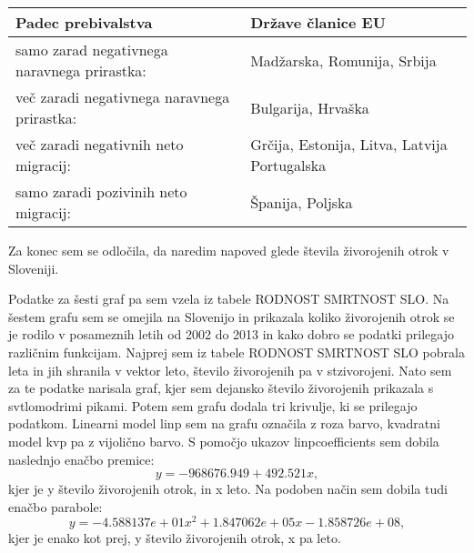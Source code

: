 \documentclass[11pt,a4paper]{article}
\begin{document}
\newpage
\begin{table} [h]

\begin{tabular}{|l| l| }

\hline

\textbf{Padec prebivalstva}&\textbf{Države članice EU} \\


\hline


\multicolumn{1}{|l|}{samo zarad negativnega naravnega prirastka:}&\multicolumn{1}{|p{8cm}|}{ Madžarska, Romunija, Srbija} \\


\hline


\multicolumn{1}{|l|}{več zaradi negativnega naravnega prirastka:}&\multicolumn{1}{|p{8cm}|}{Bulgarija, Hrvaška}\\


\hline


\multicolumn{1}{|l|}{več zaradi negativnih neto migracij:}&\multicolumn{1}{|p{8cm}|}{Grčija, Estonija, Litva, Latvija Portugalska}\\


\hline


\multicolumn{1}{|l|}{samo zaradi pozivinih neto migracij:}&\multicolumn{1}{|l|}{Španija, Poljska}\\


\hline



\end{tabular}


\end{table}



Za konec sem se odločila, da naredim napoved glede števila živorojenih otrok v Sloveniji.

Podatke za šesti graf pa sem vzela iz tabele RODNOST SMRTNOST SLO.
Na šestem grafu sem se omejila na Slovenijo in prikazala koliko živorojenih otrok se je rodilo v posameznih letih od 2002 do 2013 in kako dobro se podatki prilegajo različnim funkcijam.
Najprej sem iz tabele RODNOST SMRTNOST SLO pobrala leta in jih shranila v vektor leto, število živorojenih pa v stzivorojeni. Nato sem za te podatke narisala graf, kjer sem dejansko število živorojenih prikazala s svtlomodrimi pikami.
Potem sem grafu dodala tri krivulje, ki se prilegajo podatkom.
Linearni model linp sem na grafu označila z roza barvo, kvadratni model kvp pa z vijolično barvo. S pomočjo ukazov linpcoefficients sem dobila naslednjo enačbo premice: $$y= -968676.949 + 492.521x,$$ kjer je y število živorojenih otrok, in x leto.
Na podoben način sem dobila tudi enačbo parabole: $$y=-4.588137e+01x^2+1.847062e+05x - 1.858726e+08,$$ kjer je enako kot prej, y število živorojenih otrok, x pa leto.
\end{document}
